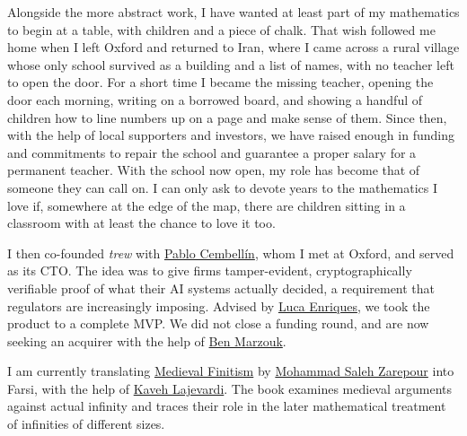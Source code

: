 \documentclass[a4paper,10pt]{article}
\newcommand{\subsectitle}[1]{\noindent{\color{brick}\fontsize{15}{17}\selectfont #1}\par\vspace{2pt}}
\newcommand{\clink}[2]{\textcolor{linkcol}{\href{#1}{#2}}}
\begin{document}
\vspace{10pt}
\subsectitle{2026 (Gap year)}
Alongside the more abstract work, I have wanted at least part of my mathematics to begin at a
table, with children and a piece of chalk. That wish followed me home when I left Oxford and
returned to Iran, where I came across a rural village whose only school survived as a building
and a list of names, with no teacher left to open the door. For a short time I became the missing
teacher, opening the door each morning, writing on a borrowed board, and showing a handful of
children how to line numbers up on a page and make sense of them. Since then, with the help of
local supporters and investors, we have raised enough in funding and commitments to repair the school and guarantee a proper salary for a permanent teacher. With the school now open, my role has become that of someone they can call on.
I can only ask to devote years to the mathematics I love if, somewhere at the
edge of the map, there are children sitting in a classroom with at least the chance to love it too.

\vspace{5pt}
I then co-founded \textit{trew} with
\textcolor{midnight}{\href{https://www.linkedin.com/in/pablo-cembell\%C3\%ADn-mazas-22b68a272/}{Pablo Cembellín}},
whom I met at Oxford, and served as its CTO. The idea was to give firms tamper-evident,
cryptographically verifiable proof of what their AI systems actually decided, a requirement that
regulators are increasingly imposing. Advised by
\textcolor{midnight}{\href{https://www.unibocconi.it/en/faculty/luca-enriques}{Luca Enriques}}, we took the product to a complete MVP. We did not close a funding round, and
are now seeking an acquirer with the help of
\textcolor{midnight}{\href{https://www.eversheds-sutherland.com/en/united-states/people/marzouk-ben}{Ben Marzouk}}.

\vspace{5pt}
I am currently translating
\clink{https://www.cambridge.org/core/elements/abs/medieval-finitism/DF1200CCF8D885032E251462187EEB8D}{Medieval Finitism}
by \textcolor{midnight}{\href{https://www.ms-zarepour.com/}{Mohammad Saleh Zarepour}} into Farsi,
with the help of \textcolor{midnight}{\href{https://www.kaavelajevardi.com/}{Kaveh Lajevardi}}. The
book examines medieval arguments against actual infinity and traces their role
in the later mathematical treatment of infinities of different sizes.

\vspace{5pt}
\end{document}
